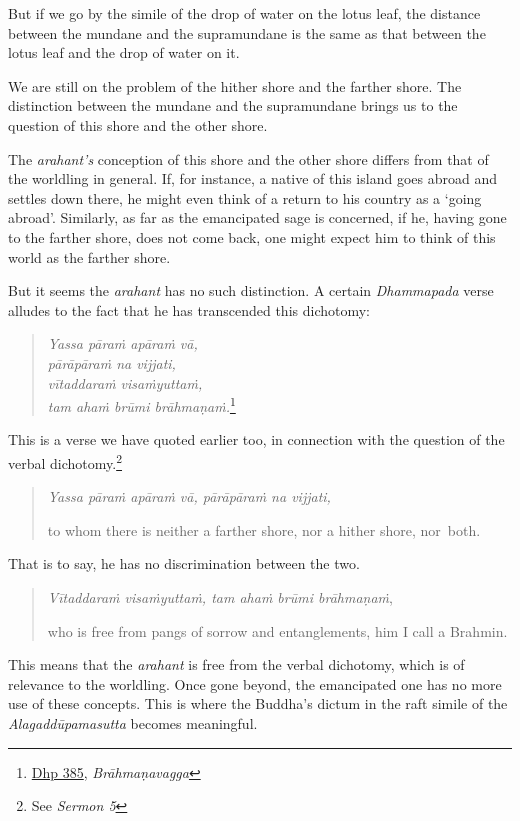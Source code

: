 But if we go by the simile of the drop of water on the lotus leaf, the distance between the mundane and the supramundane is the same as that between the lotus leaf and the drop of water on it.

We are still on the problem of the hither shore and the farther shore. The distinction between the mundane and the supramundane brings us to the question of this shore and the other shore.

The \emph{arahant's} conception of this shore and the other shore differs from that of the worldling in general. If, for instance, a native of this island goes abroad and settles down there, he might even think of a return to his country as a `going abroad'. Similarly, as far as the emancipated sage is concerned, if he, having gone to the farther shore, does not come back, one might expect him to think of this world as the farther shore.

But it seems the \emph{arahant} has no such distinction. A certain \emph{Dhammapada} verse alludes to the fact that he has transcended this dichotomy:

\begin{quote}
\emph{Yassa pāraṁ apāraṁ vā,}\\
\emph{pārāpāraṁ na vijjati,}\\
\emph{vītaddaraṁ visaṁyuttaṁ,}\\
\emph{tam ahaṁ brūmi brāhmaṇaṁ.}\footnote{\href{https://suttacentral.net/dhp383-423/pli/ms}{Dhp 385}, \emph{Brāhmaṇavagga}}
\end{quote}

This is a verse we have quoted earlier too, in connection with the question of the verbal dichotomy.\footnote{See \emph{Sermon 5}}

\begin{quote}
\emph{Yassa pāraṁ apāraṁ vā, pārāpāraṁ na vijjati,}

to whom there is neither a farther shore, nor a hither shore, nor~both.
\end{quote}

That is to say, he has no discrimination between the two.

\begin{quote}
\emph{Vītaddaraṁ visaṁyuttaṁ, tam ahaṁ brūmi brāhmaṇaṁ},

who is free from pangs of sorrow and entanglements, him I call a Brahmin.
\end{quote}

This means that the \emph{arahant} is free from the verbal dichotomy, which is of relevance to the worldling. Once gone beyond, the emancipated one has no more use of these concepts. This is where the Buddha's dictum in the raft simile of the \emph{Alagaddūpamasutta} becomes meaningful.

